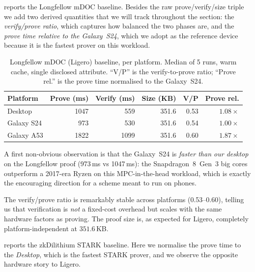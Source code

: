 \documentclass[binding=0.6cm,oneside,noexaminfo]{sapthesis}
\begin{document}
 reports the Longfellow mDOC baseline. Besides the raw
prove/verify/size triple we add two derived quantities that we will track
throughout the section: the \emph{verify/prove ratio}, which captures how
balanced the two phases are, and the \emph{prove time relative to the
Galaxy~S24}, which we adopt as the reference device because it is the
fastest prover on this workload.

\begin{table}[ht]
  \centering
  \caption{Longfellow mDOC (Ligero) baseline, per platform. Median of 5 runs,
  warm cache, single disclosed attribute. ``V/P'' is the verify-to-prove ratio;
  ``Prove rel.'' is the prove time normalised to the Galaxy~S24.}
  \label{tab:res-base-ligero}
  \small
  \begin{tabular}{@{}lrrrrr@{}}
    \toprule
    \textbf{Platform} & \textbf{Prove (ms)} & \textbf{Verify (ms)} & \textbf{Size (KB)} & \textbf{V/P} & \textbf{Prove rel.} \\
    \midrule
    Desktop    & 1047 & 559  & 351.6 & 0.53 & $1.08\times$ \\
    Galaxy S24 & 973  & 530  & 351.6 & 0.54 & $1.00\times$ \\
    Galaxy A53 & 1822 & 1099 & 351.6 & 0.60 & $1.87\times$ \\
    \bottomrule
  \end{tabular}
\end{table}

A first non-obvious observation is that the Galaxy~S24 is \emph{faster than our
desktop} on the Longfellow proof (973\,ms vs 1047\,ms): the Snapdragon~8~Gen~3
big cores outperform a 2017-era Ryzen on this MPC-in-the-head workload, which is
exactly the encouraging direction for a scheme meant to run on phones. 

The verify/prove ratio is remarkably stable across platforms (0.53--0.60), telling us
that verification is \emph{not} a fixed-cost overhead but scales with the same
hardware factors as proving. The proof size is, as expected for Ligero, completely
platform-independent at $351.6$\,KB.

 reports the zkDilithium STARK baseline. Here we
normalise the prove time to the \emph{Desktop}, which is the fastest STARK prover,
and we observe the opposite hardware story to Ligero.
\end{document}
